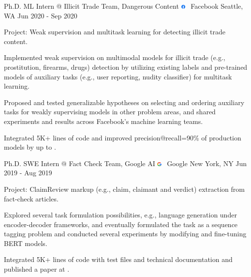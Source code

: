 \documentclass[letterpaper]{awesome-cv}
\begin{document}
\addvspace{0.2ex}
\begin{cventries}
  \cventry
    {Ph.D. ML Intern @ Illicit Trade Team, Dangerous Content}
    {\includegraphics[width=0.016\textwidth]{../images/logos/facebook.png}~ Facebook}
    {Seattle, WA}
    {Jun 2020 - Sep 2020}
    {
      \begin{cvitems}
        \item {Project: Weak supervision and multitask learning for detecting illicit trade content.}
        \item {Implemented weak supervision on multimodal models for illicit trade (e.g., prostitution, firearms, drugs) detection by utilizing existing labels and pre-trained models of auxiliary tasks (e.g., user reporting, nudity classifier) for multitask learning.}
        \item {Proposed and tested generalizable hypotheses on selecting and ordering auxiliary tasks for weakly supervising models in other problem areas, and shared experiments and results across Facebook's machine learning teams.}
        \item {Integrated 5K+ lines of code  and improved precision@recall=90\% of production models by up to .}
      \end{cvitems}
    }
  \cventry
    {Ph.D. SWE Intern @ Fact Check Team, Google AI}
    {\includegraphics[width=0.016\textwidth]{../images/logos/google.png}~ Google}
    {New York, NY}
    {Jun 2019 - Aug 2019}
    {
      \begin{cvitems}
        \item {Project: ClaimReview markup (e.g., claim, claimant and verdict) extraction from fact-check articles.}
        \item {Explored several task formulation possibilities, e.g., language generation under encoder-decoder frameworks, and eventually formulated the task as a sequence tagging problem and conducted several experiments by modifying and fine-tuning BERT models.}
        \item {Integrated 5K+ lines of code  with test files and technical documentation and published a paper at .}

\end{cvitems}}
\end{cventries}
\end{document}

